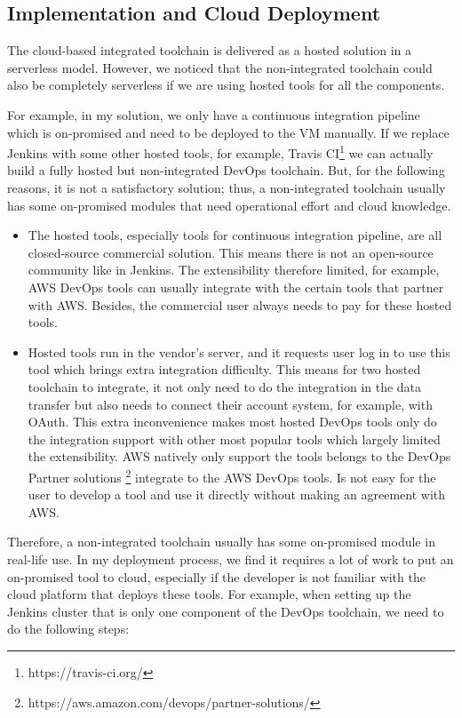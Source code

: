 \subsection{Implementation and Cloud Deployment}
The cloud-based integrated toolchain is delivered as a hosted solution in a serverless model. However, we noticed that the non-integrated toolchain could also be completely serverless if we are using hosted tools for all the components. 
\par
For example, in my solution, we only have a continuous integration pipeline which is on-promised and need to be deployed to the VM manually. If we replace Jenkins with some other hosted tools, for example, Travis CI\footnote{https://travis-ci.org/} we can actually build a fully hosted but non-integrated DevOps toolchain. But, for the following reasons, it is not a satisfactory solution; thus, a non-integrated toolchain usually has some on-promised modules that need operational effort and cloud knowledge.
\begin{itemize}
 \item The hosted tools, especially tools for continuous integration pipeline, are all closed-source commercial solution. This means there is not an open-source community like in Jenkins. The extensibility therefore limited, for example, AWS DevOps tools can usually integrate with the certain tools that partner with AWS. Besides, the commercial user always needs to pay for these hosted tools.
 \item Hosted tools run in the vendor's server, and it requests user log in to use this tool which brings extra integration difficulty. This means for two hosted toolchain to integrate, it not only need to do the integration in the data transfer but also needs to connect their account system, for example, with OAuth. This extra inconvenience makes most hosted DevOps tools only do the integration support with other most popular tools which largely limited the extensibility. AWS natively only support the tools belongs to the DevOps Partner solutions \footnote{https://aws.amazon.com/devops/partner-solutions/} integrate to the AWS DevOps tools. Is not easy for the user to develop a tool and use it directly without making an agreement with AWS.
\end{itemize}
Therefore, a non-integrated toolchain usually has some on-promised module in real-life use. In my deployment process, we find it requires a lot of work to put an on-promised tool to cloud, especially if the developer is not familiar with the cloud platform that deploys these tools. For example, when setting up the Jenkins cluster that is only one component of the DevOps toolchain, we need to do the following steps:
